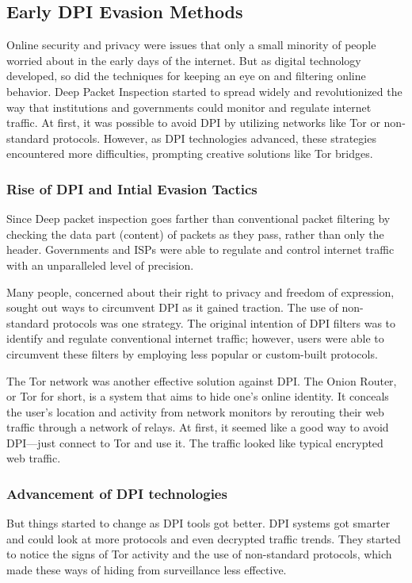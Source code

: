 \documentclass[12pt, fleqn, a4paper]{article}
\begin{document}
\subsection{Early DPI Evasion Methods}
Online security and privacy were issues that only a small minority of people worried about in the early days of the internet. But as digital technology developed, so did the techniques for keeping an eye on and filtering online behavior. Deep Packet Inspection started to spread widely and revolutionized the way that institutions and governments could monitor and regulate internet traffic. At first, it was possible to avoid DPI by utilizing networks like Tor or non-standard protocols. However, as DPI technologies advanced, these strategies encountered more difficulties, prompting creative solutions like Tor bridges. \citep{sechist}
\subsubsection{Rise of DPI and Intial Evasion Tactics}
Since Deep packet inspection goes farther than conventional packet filtering by checking the data part (content) of packets as they pass, rather than only the header. Governments and ISPs were able to regulate and control internet traffic with an unparalleled level of precision.

Many people, concerned about their right to privacy and freedom of expression, sought out ways to circumvent DPI as it gained traction. The use of non-standard protocols was one strategy. The original intention of DPI filters was to identify and regulate conventional internet traffic; however, users were able to circumvent these filters by employing less popular or custom-built protocols.

The Tor network was another effective solution against DPI. The Onion Router, or Tor for short, is a system that aims to hide one's online identity. It conceals the user's location and activity from network monitors by rerouting their web traffic through a network of relays. At first, it seemed like a good way to avoid DPI—just connect to Tor and use it. The traffic looked like typical encrypted web traffic.

\subsubsection{Advancement of DPI technologies}
But things started to change as DPI tools got better. DPI systems got smarter and could look at more protocols and even decrypted traffic trends. They started to notice the signs of Tor activity and the use of non-standard protocols, which made these ways of hiding from surveillance less effective.
\end{document}
